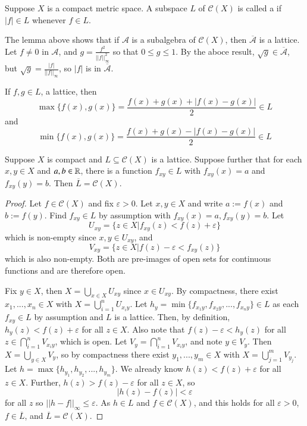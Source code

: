 \begin{definition}[Lattice]
    Suppose $X$ is a compact metric space. A subspace $L$ of $\mathcal{C}(X)$ is called a  if $|f| \in L$ whenever $f \in L$.
\end{definition}

\begin{example}
    The lemma above shows that if $\mathcal{A}$ is a subalgebra of $\mathcal{C}(X)$, then $\overline{\mathcal{A}}$ is a lattice. Let $f \neq 0$ in $\mathcal{A}$, and $g = \frac{f^2}{||f||_{\infty}^2}$ so that $0 \leq g \leq 1$. By the aboce result, $\sqrt{g} \in \overline{\mathcal{A}}$, but $\sqrt{g} = \frac{|f|}{||f||_{\infty}}$, so $|f|$ is in $\overline{\mathcal{A}}$.
\end{example}

If $f,g \in L$, a lattice, then $$\max\{f(x),g(x)\} = \frac{f(x)+g(x)+|f(x)-g(x)|}{2} \in L$$ and $$\min\{f(x),g(x)\} = \frac{f(x)+g(x)-|f(x)-g(x)|}{2} \in L$$

\begin{lemma}
    Suppose $X$ is compact and $L \subseteq \mathcal{C}(X)$ is a lattice. Suppose further that for each $x,y \in X$ and $a,b \in \mathbb R$, there is a function $f_{xy} \in L$ with $f_{xy}(x) =a $ and $f_{xy}(y) = b$. Then $\overline{L} = \mathcal{C}(X)$.
\end{lemma}
\begin{proof}
    Let $f \in \mathcal{C}(X)$ and fix $\varepsilon > 0$. Let $x,y \in X$ and write $a := f(x)$ and $b := f(y)$. Find $f_{xy} \in L$ by assumption with $f_{xy}(x) = a, f_{xy}(y) = b$. Let $$U_{xy} = \{z \in X\vert f_{xy}(z) < f(z)+\varepsilon\}$$ which is non-empty since $x,y \in U_{xy}$, and $$V_{xy} = \{z \in X\vert f(z) - \varepsilon < f_{xy}(z)\}$$ which is also non-empty. Both are pre-images of open sets for continuous functions and are therefore open. 

    Fix $y \in X$, then $X = \bigcup_{x \in X}U_{xy}$ since $x \in U_{xy}$. By compactness, there exist $x_1,...,x_n \in X$ with $X = \bigcup_{i=1}^nU_{x_iy}$. Let $h_y = \min\{f_{x_1y},f_{x_2y},...,f_{x_ny}\} \in L$ as each $f_{xy} \in L$ by assumption and $L$ is a lattice. Then, by definition, $h_y(z) < f(z) + \varepsilon$ for all $z \in X$. Also note that $f(z) - \varepsilon < h_y(z)$ for all $z \in \bigcap_{i=1}^nV_{x_iy}$, which is open. Let $V_y = \bigcap_{i=1}^nV_{x_iy}$, and note $y \in V_y$. Then $X = \bigcup_{y \in X}V_y$, so by compactness there exist $y_1,...,y_m \in X$ with $X = \bigcup_{j=1}^mV_{y_j}$. Let $h = \max\{h_{y_1},h_{y_2},...,h_{y_m}\}$. We already know $h(z) < f(z) + \varepsilon$ for all $z \in X$. Further, $h(z) > f(z) - \varepsilon$ for all $z \in X$, so $$|h(z) - f(z)| < \varepsilon$$ for all $z$ so $||h-f||_{\infty} \leq \varepsilon$. As $h \in L$ and $f \in \mathcal{C}(X)$, and this holds for all $\varepsilon > 0$, $f \in \overline{L}$, and $\overline{L} = \mathcal{C}(X)$.
\end{proof}

